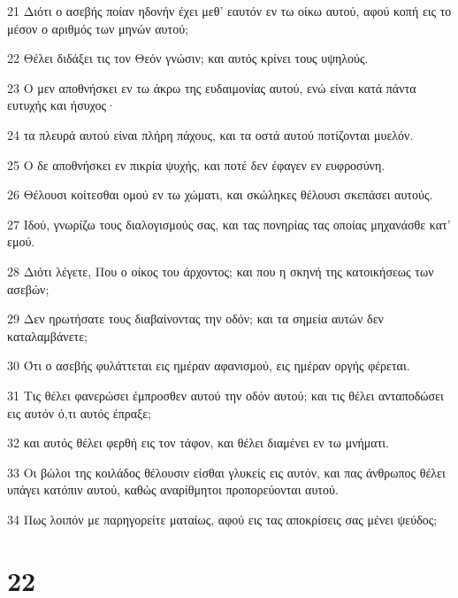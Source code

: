 \par 21 Διότι ο ασεβής ποίαν ηδονήν έχει μεθ' εαυτόν εν τω οίκω αυτού, αφού κοπή εις το μέσον ο αριθμός των μηνών αυτού;
\par 22 Θέλει διδάξει τις τον Θεόν γνώσιν; και αυτός κρίνει τους υψηλούς.
\par 23 Ο μεν αποθνήσκει εν τω άκρω της ευδαιμονίας αυτού, ενώ είναι κατά πάντα ευτυχής και ήσυχος·
\par 24 τα πλευρά αυτού είναι πλήρη πάχους, και τα οστά αυτού ποτίζονται μυελόν.
\par 25 Ο δε αποθνήσκει εν πικρία ψυχής, και ποτέ δεν έφαγεν εν ευφροσύνη.
\par 26 Θέλουσι κοίτεσθαι ομού εν τω χώματι, και σκώληκες θέλουσι σκεπάσει αυτούς.
\par 27 Ιδού, γνωρίζω τους διαλογισμούς σας, και τας πονηρίας τας οποίας μηχανάσθε κατ' εμού.
\par 28 Διότι λέγετε, Που ο οίκος του άρχοντος; και που η σκηνή της κατοικήσεως των ασεβών;
\par 29 Δεν ηρωτήσατε τους διαβαίνοντας την οδόν; και τα σημεία αυτών δεν καταλαμβάνετε;
\par 30 Ότι ο ασεβής φυλάττεται εις ημέραν αφανισμού, εις ημέραν οργής φέρεται.
\par 31 Τις θέλει φανερώσει έμπροσθεν αυτού την οδόν αυτού; και τις θέλει ανταποδώσει εις αυτόν ό,τι αυτός έπραξε;
\par 32 και αυτός θέλει φερθή εις τον τάφον, και θέλει διαμένει εν τω μνήματι.
\par 33 Οι βώλοι της κοιλάδος θέλουσιν είσθαι γλυκείς εις αυτόν, και πας άνθρωπος θέλει υπάγει κατόπιν αυτού, καθώς αναρίθμητοι προπορεύονται αυτού.
\par 34 Πως λοιπόν με παρηγορείτε ματαίως, αφού εις τας αποκρίσεις σας μένει ψεύδος;

\chapter{22}

